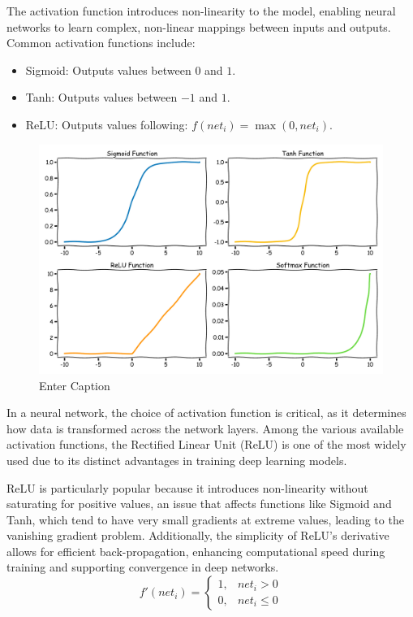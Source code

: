The activation function introduces non-linearity to the model, enabling neural networks to learn complex, non-linear mappings between inputs and outputs. Common activation functions include:
\begin{itemize}
    \item Sigmoid: Outputs values between $0$ and $1$.
    \item Tanh: Outputs values between $-1$ and $1$.
    \item ReLU: Outputs values following: $f(\textit{net}_i) = \max(0, \textit{net}_i)$.
\end{itemize}

\begin{figure}
    \centering
    \includegraphics[width=1\linewidth]{LateX//figs/activation_functions_xkcd.pdf}
    \caption{Enter Caption}
    \label{fig:enter-label}
\end{figure}

In a neural network, the choice of activation function is critical, as it determines how data is transformed across the network layers. Among the various available activation functions, the Rectified Linear Unit (ReLU) is one of the most widely used due to its distinct advantages in training deep learning models.

ReLU is particularly popular because it introduces non-linearity without saturating for positive values, an issue that affects functions like Sigmoid and Tanh, which tend to have very small gradients at extreme values, leading to the vanishing gradient problem. Additionally, the simplicity of ReLU’s derivative allows for efficient back-propagation, enhancing computational speed during training and supporting convergence in deep networks.
\begin{equation}
    f'(\textit{net}_i) =
    \begin{cases}
    1, & \textit{net}_i > 0 \\
    0, & \textit{net}_i \leq 0
    \end{cases}
\end{equation}

